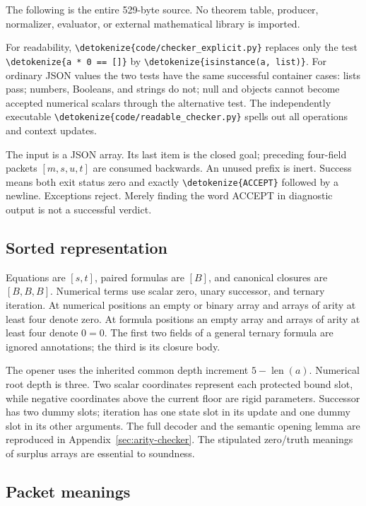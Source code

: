 \documentclass[11pt,letterpaper]{article}
\theoremstyle{definition}\newtheorem{definition}[theorem]{Definition}
\theoremstyle{remark}\newtheorem{remark}[theorem]{Remark}
\newcommand{\file}[1]{\expandafter\nolinkurl\expandafter{\detokenize{#1}}}
\begin{document}
The following is the entire 529-byte source. No theorem table, producer,
normalizer, evaluator, or external mathematical library is imported.


For readability, \file{code/checker_explicit.py} replaces only the test
\file{a * 0 == []} by \file{isinstance(a, list)}. For ordinary JSON values
the two tests have the same successful container cases: lists pass; numbers,
Booleans, and strings do not; null and objects cannot become accepted
numerical scalars through the alternative test. The independently executable
\file{code/readable_checker.py} spells out all operations and context updates.

The input is a JSON array. Its last item is the closed goal; preceding
four-field packets $[m,s,u,t]$ are consumed backwards. An unused prefix is
inert. Success means both exit status zero and exactly \file{ACCEPT} followed
by a newline. Exceptions reject. Merely finding the word ACCEPT in diagnostic
output is not a successful verdict.

\subsection{Sorted representation}

Equations are $[s,t]$, paired formulas are $[B]$, and canonical closures
are $[B,B,B]$. Numerical terms use scalar zero, unary successor, and ternary
iteration. At numerical positions an empty or binary array and arrays of
arity at least four denote zero. At formula positions an empty array and
arrays of arity at least four denote $0=0$. The first two fields of a general
ternary formula are ignored annotations; the third is its closure body.

The opener uses the inherited common depth increment
$5-\operatorname{len}(a)$. Numerical root depth is three. Two scalar
coordinates represent each protected bound slot, while negative coordinates
above the current floor are rigid parameters. Successor has two dummy slots;
iteration has one state slot in its update and one dummy slot in its other
arguments. The full decoder and the semantic opening lemma are reproduced
in Appendix~\ref{sec:arity-checker}. The stipulated zero/truth meanings of
surplus arrays are essential to soundness.

\subsection{Packet meanings}
\end{document}
